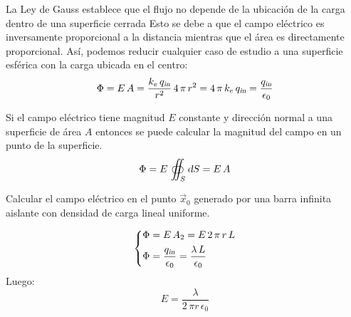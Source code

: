 La Ley de Gauss establece que el flujo no depende de la ubicación de la carga dentro de una superficie cerrada
Esto se debe a que el campo eléctrico es inversamente proporcional a la distancia mientras que el área es directamente proporcional.
Así, podemos reducir cualquier caso de estudio a una superficie esférica con la carga ubicada en el centro:
\begin{equation*}
    \Phi = E \, A = \frac{k_e \, {{q}_\textsl{{in}}}}{r^2} \, 4 \, \pi \, r^2 = 4 \, \pi \, k_e \, {{q}_\textsl{{in}}} = \frac{{{q}_\textsl{{in}}}}{\epsilon_0}
\end{equation*}

Si el campo eléctrico tiene magnitud $E$ constante y dirección normal a una superficie de área $A$ entonces se puede calcular la magnitud del campo en un punto de la superficie.
\begin{equation*}
    \Phi = E \, \oiint_S \textsl{d} S = E \, A
\end{equation*}

\begin{mdframed}[style=ExampleFrame]
    \begin{example}
    \end{example}
    \begin{formatI}
        Calcular el campo eléctrico en el punto $\vec{x}_0$ generado por una barra infinita aislante con densidad de carga lineal uniforme.
    \end{formatI}
    \begin{center}
        \def\svgwidth{0.6\linewidth}
        
    \end{center}
    \begin{equation*}
        \left\{
        \begin{aligned}
            \Phi &= E \, A_2 = E \, 2 \, \pi \, r \, L
            \\
            \Phi &= \frac{{{q}_\textsl{{in}}}}{\epsilon_0} = \frac{\lambda \, L}{\epsilon_0}
        \end{aligned}
        \right.
    \end{equation*}
    Luego:
    \begin{equation*}
        E = \frac{\lambda}{2 \, \pi r \, \epsilon_0}
    \end{equation*}
\end{mdframed}

